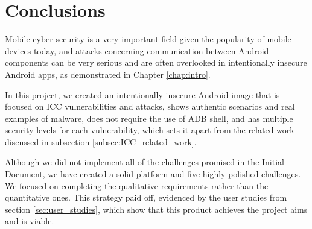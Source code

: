 	\vspace{-3mm}
	\section{Conclusions}
	    \label{sec:conclusions}
	\vspace{-2mm}
	
	Mobile cyber security is a very important field given the popularity of mobile devices today, and attacks concerning communication between Android components can be very serious and are often overlooked in intentionally insecure Android apps, as demonstrated in Chapter \ref{chap:intro}.
	
	In this project, we created an intentionally insecure Android image that is focused on ICC vulnerabilities and attacks, shows authentic scenarios and real examples of malware, does not require the use of ADB shell, and has multiple security levels for each vulnerability, which sets it apart from the related work discussed in subsection \ref{subsec:ICC_related_work}.
	
	Although we did not implement all of the challenges promised in the Initial Document, we have created a solid platform and five highly polished challenges. We focused on completing the qualitative requirements rather than the quantitative ones. This strategy paid off, evidenced by the user studies from section \ref{sec:user_studies}, which show that this product achieves the project aims and is viable.